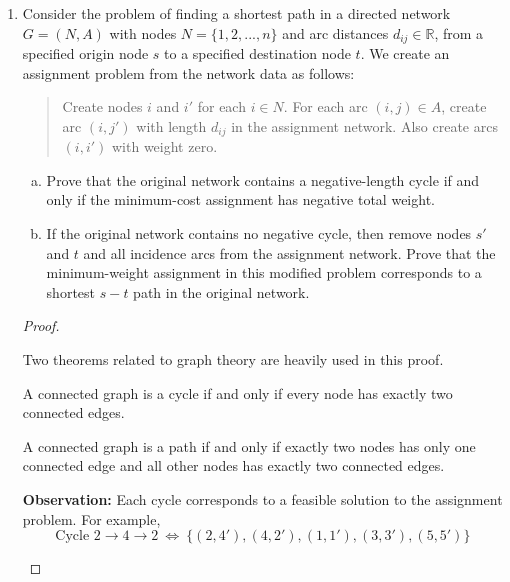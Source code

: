 \begin{enumerate}
	\newpage
	\item Consider the problem of finding a shortest path in a directed network $G = (N, A)$ with
	nodes $N = \{1, 2, . . . , n\}$ and arc distances $d_{ij} \in \mathbb{R}$, from a specified origin node $s$ to a
	specified destination node $t$. We create an assignment problem from the network data
	as follows:
	\begin{quote}
		Create nodes $i$ and $i'$
		for each $i \in N$. For each arc $(i, j) \in A$, create arc $(i, j')$ with length $d_{ij}$ in the assignment network. Also create arcs $(i, i')$ with
		weight zero.
	\end{quote}
	\begin{enumerate}[(a)]
		\item Prove that the original network contains a negative-length cycle if and only if the
		minimum-cost assignment has negative total weight.
		\item  If the original network contains no negative cycle, then remove nodes $s'$ and $t$ and
		all incidence arcs from the assignment network. Prove that the minimum-weight
		assignment in this modified problem corresponds to a shortest $s-t$ path in the
		original network.
	\end{enumerate}
	\begin{proof}~
		\begin{tcolorbox}
			Two theorems related to graph theory are heavily used in this proof.
			\begin{thm}
				A connected graph is a cycle if and only if every node has exactly two connected edges.
			\end{thm}
			\begin{thm}
				A connected graph is a path if and only if exactly two nodes has only one connected edge and all other nodes has exactly two connected edges.
			\end{thm}
		 	\textbf{Observation:} Each cycle corresponds to a feasible solution to the assignment problem. For example,
		 	\[
		 	\text{Cycle }2\rightarrow 4 \rightarrow 2 ~\Leftrightarrow~ \{(2,4'),(4,2'),(1,1'),(3,3'),(5,5')\}
		 	\]
		 	

\end{tcolorbox}
\end{proof}
\end{enumerate}

